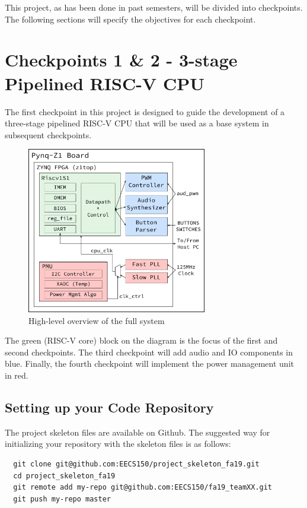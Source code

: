 \documentclass[11pt]{article}
\begin{document}
This project, as has been done in past semesters, will be divided into checkpoints. The following sections will specify the objectives for each checkpoint.

\section{Checkpoints 1 \& 2 - 3-stage Pipelined RISC-V CPU}
The first checkpoint in this project is designed to guide the development of a three-stage pipelined RISC-V CPU that will be used as a base system in subsequent checkpoints.

\begin{figure}[hbt]
\begin{center}
  \includegraphics[width=0.7\textwidth]{fa19_overview.pdf}
  \caption{High-level overview of the full system}
  \label{fig:sys_overview}
\end{center}
\end{figure}

The green (RISC-V core) block on the diagram is the focus of the first and second checkpoints.
The third checkpoint will add audio and IO components in blue.
Finally, the fourth checkpoint will implement the power management unit in red.

\subsection{Setting up your Code Repository}
The project skeleton files are available on Github.
The suggested way for initializing your repository with the skeleton files is as follows:

\begin{verbatim}
  git clone git@github.com:EECS150/project_skeleton_fa19.git
  cd project_skeleton_fa19
  git remote add my-repo git@github.com:EECS150/fa19_teamXX.git
  git push my-repo master
\end{verbatim}
\end{document}
